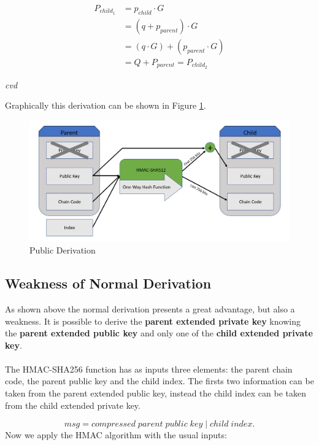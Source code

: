 \begin{equation*} \label{eq2}
\begin{split}
P_{child_1} & = p_{child} \cdot G \\
& = (q+p_{parent}) \cdot G \\
& = (q \cdot G) + (p_{parent}\cdot G) \\
& = Q + P_{parent} = P_{child_2}
\end{split}
\end{equation*}
\begin{flushright}
	\textit{cvd}
\end{flushright}
Graphically this derivation can be shown in Figure \ref{fig:pubtopub}.
\begin{figure}[ht!]
	\centering
	\includegraphics[width=14.5cm]{Figures/pubtopub.png} %
	\caption{Public Derivation}
	\label{fig:pubtopub}
\end{figure}

\subsection{Weakness of Normal Derivation}
As shown above the normal derivation presents a great advantage, but also a weakness. It is possible to derive the \textbf{parent extended private key} knowing the \textbf{parent extended public key} and only one of the \textbf{child extended private key}.
\\ \\
The HMAC-SHA256 function has as inputs three elements: the parent chain code, the parent public key and the child index. The firsts two information can be taken from the parent extended public key, instead the child index can be taken from the child extended private key.

\begin{equation*}
msg = compressed \;parent\; public\;key \;|\;child\; index.
\end{equation*}
Now we apply the HMAC algorithm with the usual inputs:

